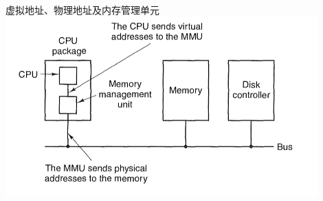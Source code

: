 \documentclass[xcolor=svgnames]{beamer}
\begin{document}
\begin{CJK*}{UTF8}{gbsn}
\begin{frame}{虚拟地址、物理地址及内存管理单元}
\includegraphics[width=0.9\textwidth]{mmu.png}
\end{frame}



\end{CJK*}
\end{document}
